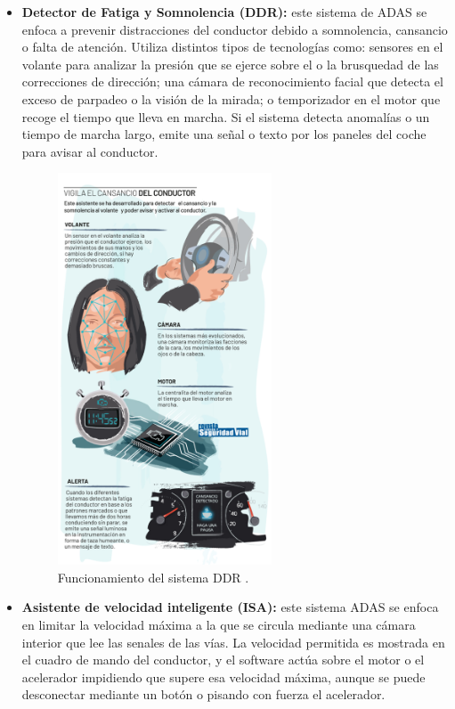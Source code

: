 \documentclass[12pt]{report} %
\begin{document}
\begin{itemize}

    \item \textbf{Detector de Fatiga y Somnolencia (DDR):} este sistema de ADAS se enfoca a prevenir distracciones del conductor debido a somnolencia, cansancio o falta de atención. Utiliza distintos tipos de tecnologías como: sensores en el volante para analizar la presión que se ejerce sobre el o la brusquedad de las correcciones de dirección; una cámara de reconocimiento facial que detecta el exceso de parpadeo o la visión de la mirada; o temporizador en el motor que recoge el tiempo que lleva en marcha. Si el sistema detecta anomalías o un tiempo de marcha largo, emite una señal o texto por los paneles del coche para avisar al conductor.
    \begin{figure}[H]
		\centering
		\includegraphics[width=0.6\textwidth]{adasDDR.jpg}
		\caption{Funcionamiento del sistema DDR \cite{adasObligatorios}.}
		\label{fig:imagen11}
	\end{figure}
	\item \textbf{Asistente de velocidad inteligente (ISA):} este sistema ADAS se enfoca en limitar la velocidad máxima a la que se circula mediante una cámara interior que lee las senales de las vías. La velocidad permitida es mostrada en el cuadro de mando del conductor, y el software actúa sobre el motor o el acelerador impidiendo que supere esa velocidad máxima, aunque se puede desconectar mediante un botón o pisando con fuerza el acelerador.

\end{itemize}
\end{document}
